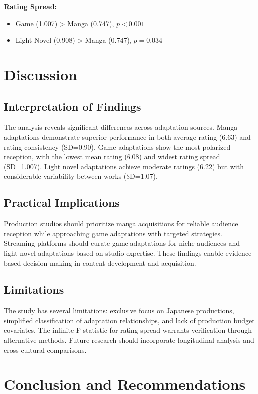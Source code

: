 \documentclass{article}
\begin{document}
\textbf{Rating Spread:}
\begin{itemize}
    \item Game (1.007) > Manga (0.747), $p<0.001$
    \item Light Novel (0.908) > Manga (0.747), $p=0.034$
\end{itemize}

\section{Discussion}

\subsection{Interpretation of Findings}
The analysis reveals significant differences across adaptation sources. Manga adaptations demonstrate superior performance in both average rating (6.63) and rating consistency (SD=0.90). Game adaptations show the most polarized reception, with the lowest mean rating (6.08) and widest rating spread (SD=1.007). Light novel adaptations achieve moderate ratings (6.22) but with considerable variability between works (SD=1.07).

\subsection{Practical Implications}
Production studios should prioritize manga acquisitions for reliable audience reception while approaching game adaptations with targeted strategies. Streaming platforms should curate game adaptations for niche audiences and light novel adaptations based on studio expertise. These findings enable evidence-based decision-making in content development and acquisition.

\subsection{Limitations}
The study has several limitations: exclusive focus on Japanese productions, simplified classification of adaptation relationships, and lack of production budget covariates. The infinite F-statistic for rating spread warrants verification through alternative methods. Future research should incorporate longitudinal analysis and cross-cultural comparisons.

\section{Conclusion and Recommendations}
\end{document}
